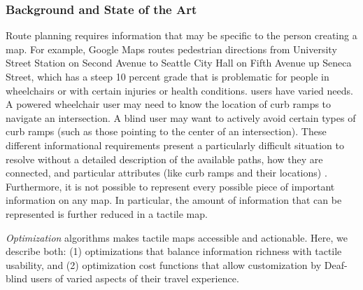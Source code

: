 
\subsubsection{Background and State of the Art}

Route planning requires information that may be specific to the person creating a map. For example, Google Maps routes pedestrian directions from University Street Station on Second Avenue to Seattle City Hall on Fifth Avenue up Seneca Street, which has a steep 10 percent grade that is problematic for people in wheelchairs or with certain injuries or health conditions.
users have varied needs.  A powered wheelchair user may need to know the location of curb ramps to navigate an intersection. A blind user may want to actively avoid certain types of curb ramps (such as those pointing to the center of an intersection). These different informational requirements present a particularly difficult situation to resolve without a detailed description of the available paths, how they are connected, and particular attributes (like curb ramps and their locations) \cite{bolten2017}. Furthermore, it is not possible to represent every possible piece of important information on any map. In particular, the amount of information that can be represented is further reduced in a tactile map. 

\textit{Optimization} algorithms makes tactile maps accessible and actionable.  Here, we describe both: (1) optimizations that balance information richness with tactile usability, and (2) optimization cost functions that allow customization by Deaf-blind users of varied aspects of their travel experience.


